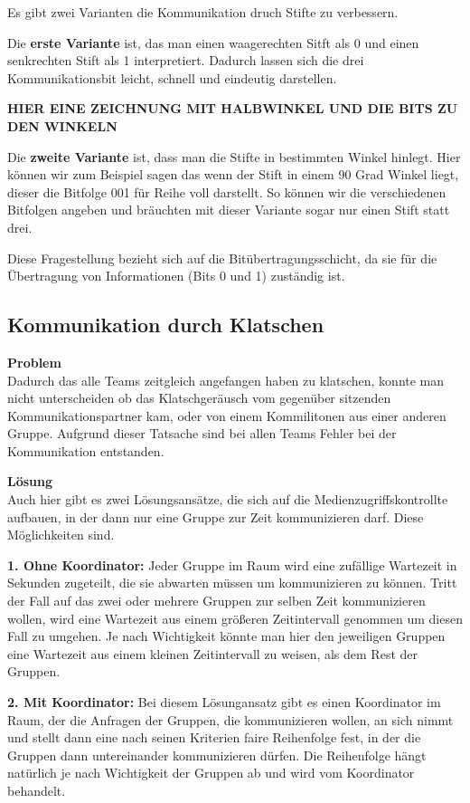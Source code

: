 \documentclass{scrartcl}
\begin{document}
  Es gibt zwei Varianten die Kommunikation druch Stifte zu verbessern.
  
  Die \textbf{erste Variante} ist, das man einen waagerechten Sitft als 0 und einen senkrechten Stift als 1 interpretiert. Dadurch lassen sich die drei Kommunikationsbit leicht, schnell und eindeutig darstellen.
  
  \textbf{HIER EINE ZEICHNUNG MIT HALBWINKEL UND DIE BITS ZU DEN WINKELN}
  
  Die \textbf{zweite Variante} ist, dass man die Stifte in bestimmten Winkel hinlegt. Hier können wir zum Beispiel sagen das wenn der Stift in einem 90 Grad Winkel liegt, dieser die Bitfolge 001 für Reihe voll darstellt. So können wir die verschiedenen Bitfolgen angeben und bräuchten mit dieser Variante sogar nur einen Stift statt drei.
  
  Diese Fragestellung bezieht sich auf die Bitübertragungsschicht, da sie für die Übertragung von Informationen (Bits 0 und 1) zuständig ist.
  
   \subsection[Aufgabe 6 Kommunikation durch Klatschen]{Kommunikation durch Klatschen}
   
   \textbf{Problem}\\
   Dadurch das alle Teams zeitgleich angefangen haben zu klatschen, konnte man nicht unterscheiden ob das Klatschgeräusch vom gegenüber sitzenden Kommunikationspartner kam, oder von einem Kommilitonen aus einer anderen Gruppe. Aufgrund dieser Tatsache sind bei allen Teams Fehler bei der Kommunikation entstanden.
   
   \textbf{Lösung}\\
   Auch hier gibt es zwei Lösungsansätze, die sich auf die Medienzugriffskontrollte aufbauen, in der dann nur eine Gruppe zur Zeit kommunizieren darf. Diese Möglichkeiten sind.
   
   \textbf{1. Ohne Koordinator:} Jeder Gruppe im Raum wird eine zufällige Wartezeit in Sekunden zugeteilt, die sie abwarten müssen um kommunizieren zu können. Tritt der Fall auf das zwei oder mehrere Gruppen zur selben Zeit kommunizieren wollen, wird eine Wartezeit aus einem größeren Zeitintervall genommen um diesen Fall zu umgehen. Je nach Wichtigkeit könnte man hier den jeweiligen Gruppen eine Wartezeit aus einem kleinen Zeitintervall zu weisen, als dem Rest der Gruppen.
   
   \textbf{2. Mit Koordinator:} Bei diesem Lösungansatz gibt es einen Koordinator im Raum, der die Anfragen der Gruppen, die kommunizieren wollen, an sich nimmt und stellt dann eine nach seinen Kriterien faire Reihenfolge fest, in der die Gruppen dann untereinander kommunizieren dürfen. Die Reihenfolge hängt natürlich je nach Wichtigkeit der Gruppen ab und wird vom Koordinator behandelt.
   
\end{document}
